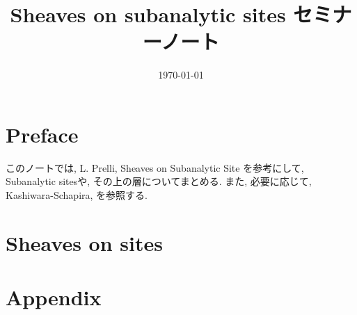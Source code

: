 \documentclass[nomag*,a4paper,leqno,uplatex]{jsarticle}
\title{\vspace{-2.5em}Sheaves on subanalytic sites セミナーノート\vspace{-1em}}
\date{\vspace{-1em}\today\vspace{-1.5em}}
\numberwithin{thm}{subsection}
\numberwithin{equation}{subsection}
\begin{document}
\maketitle
\tableofcontents
\addtocounter{section}{-1}
\section{Preface}
このノートでは,
L. Prelli,
Sheaves on Subanalytic Site \cite{book:Prelli}
を参考にして,
Subanalytic sitesや,
その上の層についてまとめる.
また, 必要に応じて,
Kashiwara-Schapira\cite{book:KS_sh}, \cite{book:KS_cat}
を参照する.

\section{Sheaves on sites}

\section{Appendix}


\end{document}
